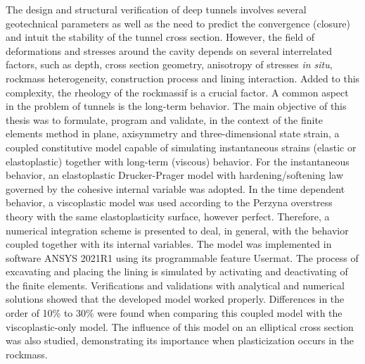 The design and structural verification of deep tunnels involves several geotechnical parameters as well as the need to predict the convergence (closure) and intuit the stability of the tunnel cross section. However, the field of deformations and stresses around the cavity depends on several interrelated factors, such as depth, cross section geometry, anisotropy of stresses \textit{in situ}, rockmass heterogeneity, construction process and lining interaction. Added to this complexity, the rheology of the rockmassif is a crucial factor. A common aspect in the problem of tunnels is the long-term behavior. The main objective of this thesis was to formulate, program and validate, in the context of the finite elements method in plane, axisymmetry and three-dimensional state strain, a coupled constitutive model capable of simulating instantaneous strains (elastic or elastoplastic) together with long-term (viscous) behavior. For the instantaneous behavior, an elastoplastic Drucker-Prager model with hardening/softening law governed by the cohesive internal variable was adopted. In the time dependent behavior, a viscoplastic model was used according to the Perzyna overstress theory with the same elastoplasticity surface, however perfect. Therefore, a numerical integration scheme is presented to deal, in general, with the behavior coupled together with its internal variables. The model was implemented in software ANSYS 2021R1 using its programmable feature Usermat. The process of excavating and placing the lining is simulated by activating and deactivating of the finite elements. Verifications and validations with analytical and numerical solutions showed that the developed model worked properly. Differences in the order of 10\% to 30\% were found when comparing this coupled model with the viscoplastic-only model. The influence of this model on an elliptical cross section was also studied, demonstrating its importance when plasticization occurs in the rockmass.
